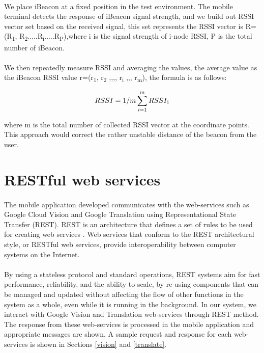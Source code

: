 \documentclass[12pt]{article}
\begin{document}
\paragraph{}We place iBeacon at a fixed position in the test environment. The mobile terminal detects the response of iBeacon signal strength, and we build out RSSI vector set based on the received signal, this set represents the RSSI vector is R=(R\textsubscript{1}, R\textsubscript{2}.....R\textsubscript{i}.....R\textsubscript{P}),where i is the signal strength of i-node RSSI, P is the total number of iBeacon. \cite{distanceTrack}

\paragraph{}We then repeatedly measure RSSI and averaging the values, the average value as the iBeacon RSSI value r=(r\textsubscript{1}, r\textsubscript{2} ,,,, r\textsubscript{i} ,,, r\textsubscript{m}), the formula is as follows:

\begin{equation}
RSSI = 1/m \sum_{i=1}^m RSSI \textsubscript{i}
\end{equation}

where m is the total number of collected RSSI vector at the coordinate points. This approach would correct the rather unstable distance of the beacon from the user. 


\section{RESTful web services}
\paragraph{} The mobile application developed communicates with the web-services such as Google Cloud Vision and Google Translation using Representational State Transfer (REST).  REST is an 
architecture that defines a set of rules to be used for creating web services \cite{rest}. Web services that conform to the REST architectural style, or RESTful web services, provide interoperability between computer systems on the Internet.

\paragraph{}By using a stateless protocol and standard operations, REST systems aim for fast performance, reliability, and the ability to scale, by re-using components that can be managed and updated without affecting the flow of other functions in the system as a whole, even while it is running in the background. In our system, we interact with Google Vision and Translation web-services through REST method. The response from these web-services is processed in the mobile application and appropriate messages are shown. A sample request and response for each web-services is shown in Sections \ref{vision} and \ref{translate}.
\end{document}
